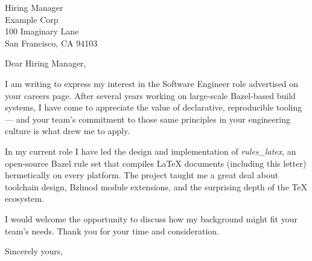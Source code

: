 \documentclass[12pt]{letter}
\begin{document}
\begin{letter}{
    Hiring Manager \\
    Example Corp \\
    100 Imaginary Lane \\
    San Francisco, CA 94103
}

\opening{Dear Hiring Manager,}

I am writing to express my interest in the Software Engineer role
advertised on your careers page. After several years working on
large-scale Bazel-based build systems, I have come to appreciate the
value of declarative, reproducible tooling --- and your team's
commitment to those same principles in your engineering culture is
what drew me to apply.

In my current role I have led the design and implementation of
\emph{rules\_latex}, an open-source Bazel rule set that compiles
LaTeX documents (including this letter) hermetically on every
platform. The project taught me a great deal about toolchain design,
Bzlmod module extensions, and the surprising depth of the TeX
ecosystem.

I would welcome the opportunity to discuss how my background might
fit your team's needs. Thank you for your time and consideration.

\closing{Sincerely yours,}


\end{letter}
\end{document}
